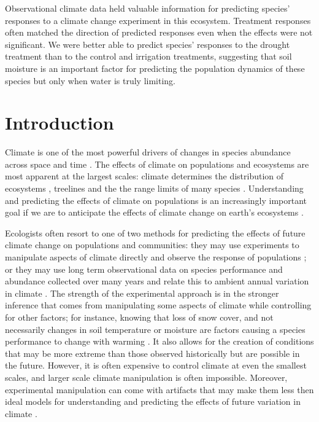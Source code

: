 \documentclass[11pt]{article}
\begin{document}
\begin{doublespacing}
Observational climate data held valuable information for predicting species' responses to a climate change experiment in this ecosystem. Treatment responses often matched the direction of predicted responses even when the effects were not significant. We were better able to predict species' responses to the drought treatment than to the control and irrigation treatments, suggesting that soil moisture is an important factor for predicting the population dynamics of these species but only when water is truly limiting.

\section*{Introduction}

Climate is one of the most powerful drivers of changes in species abundance across space and time \citep{post_synchronization_2002,davis_range_2001,walther_ecological_2002}. The effects of climate on populations and ecosystems are most apparent at the largest scales: climate determines the distribution of ecosystems \citep{whittaker_communities_1975}, treelines \citep{korner_alpine_2012} and the the range limits of many species \citep{parmesan_globally_2003,davis_range_2001}. Understanding and predicting the effects of climate on populations is an increasingly important goal if we are to anticipate the effects of climate change on earth's ecosystems \citep{tredennick_we_2016,petchey_ecological_2015,ehrlen_advancing_2016,teller_linking_2016}.
 
Ecologists often resort to one of two methods for predicting the effects of future climate change on populations and communities: they may use experiments to manipulate aspects of climate directly and observe the response of populations \citep{elmendorf_experiment_2015,knapp_pushing_2016,compagnoni_warming_2014}; or they may use long term observational data on species performance and abundance collected over many years and relate this to ambient annual variation in climate  \citep{koons_climate_2012,lunn_demography_2016,dalgleish_climate_2010,jenouvrier_demographic_2009}. The strength of the experimental approach is in the stronger inference that comes from manipulating some aspects of climate while controlling for other factors; for instance, knowing that loss of snow cover, and not necessarily changes in soil temperature or moisture are factors causing a species performance to change with warming \citep{compagnoni_warming_2014}. It also allows for the creation of conditions that may be more extreme than those observed historically \cite{knapp_pushing_2016} but are possible in the future. However, it is often expensive to control climate at even the smallest scales, and larger scale climate manipulation is often impossible.  Moreover, experimental manipulation can come with artifacts that may make them less then ideal models for understanding and predicting the effects of future variation in climate \citep{wolkovich_warming_2012}. 


\end{doublespacing}
\end{document}
